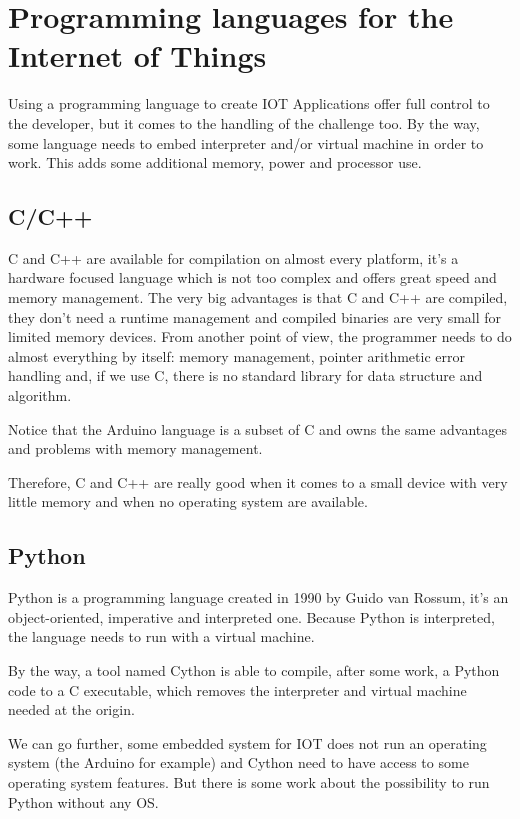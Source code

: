 \section{Programming languages for the Internet of Things}
\label{sec:pl_for_iot}

Using a programming language to create IOT Applications offer full control to
the developer, but it comes to the handling of the challenge too. By the way, some
language needs to embed interpreter and/or virtual machine in order to work. This
adds some additional memory, power and processor use.

\subsection{C/C++}
\label{subsec:cc++}

C and C++ are available for compilation on almost every platform, it’s a
hardware focused language which is not too complex and offers great speed and
memory management. The very big advantages is that C and C++ are compiled, they
don’t need a runtime management and compiled binaries are very small for limited
memory devices. From another point of view, the programmer needs to do almost
everything by itself: memory management, pointer arithmetic error handling
and, if we use C, there is no standard library for data structure and algorithm.

Notice that the Arduino language is a subset of C and owns the same advantages
and problems with memory management.

Therefore, C and C++ are really good when it comes to a small device with very
little memory and when no operating system are available.

\subsection{Python}
\label{subsec:python}

Python is a programming language created in 1990 by Guido van Rossum, it’s an
object-oriented, imperative and interpreted one. Because Python is interpreted,
the language needs to run with a virtual machine.

By the way, a tool named Cython\cite{behnel2010cython} is able to compile, after
some work, a Python code to a C executable, which removes the interpreter and
virtual machine needed at the origin.

We can go further, some embedded system for IOT does not run an operating system
(the Arduino for example) and Cython need to have access to some operating
system features. But there is some work about the possibility to run Python
without any OS\cite{jakeedge2015}.

